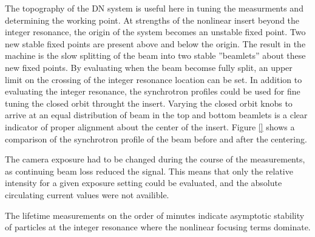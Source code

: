 The topography of the DN system is useful here in tuning the measurments and determining the working point. At strengths of the nonlinear insert beyond the integer resonance, the origin of the system becomes an unstable fixed point. Two new stable fixed points are present above and below the origin. The result in the machine is the slow splitting of the beam into two stable ”beamlets” about these new fixed points. By evaluating when the beam becomse fully split, an upper limit on the crossing of the integer resonance location can be set. In addition to evaluating the integer resonance, the synchrotron profiles could be used for fine tuning the closed orbit throught the insert. Varying the closed orbit knobs to arrive at an equal distribution of beam in the top and bottom beamlets is a  clear indicator of proper alignment about the center of the insert. Figure \ref{} shows a comparison of the synchrotron profile of the beam before and after the centering.

The camera exposure had to be changed during the course of the measurements, as continuing beam loss reduced the signal. This means that only the relative intensity for a given exposure setting could be evaluated, and the absolute circulating current values were not availible. 

The lifetime measurements on the order of minutes indicate asymptotic stability of particles at the integer resonance where the nonlinear focusing terms dominate.
